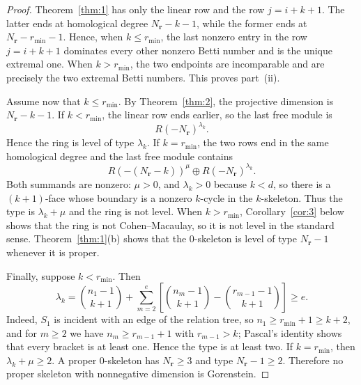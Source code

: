 \documentclass[10pt,a4paper]{amsart}
\begin{document}
\begin{proof}
		Theorem~\ref{thm:1} has only the linear row and the row $j=i+k+1$. The latter ends at homological degree $N_{\mathbf r}-k-1$, while the former ends at $N_{\mathbf r}-r_{\min}-1$. Hence, when $k\le r_{\min}$, the last nonzero entry in the row $j=i+k+1$ dominates every other nonzero Betti number and is the unique extremal one. When $k>r_{\min}$, the two endpoints are incomparable and are precisely the two extremal Betti numbers. This proves part~(ii).
		
		Assume now that $k\le r_{\min}$. By Theorem~\ref{thm:2}, the projective dimension is $N_{\mathbf r}-k-1$. If $k<r_{\min}$, the linear row ends earlier, so the last free module is
		\[
		R(-N_{\mathbf r})^{\lambda_k}.
		\]
		Hence the ring is level of type $\lambda_k$. If $k=r_{\min}$, the two rows end in the same homological degree and the last free module contains
		\[
		R(-(N_{\mathbf r}-k))^{\mu}\oplus R(-N_{\mathbf r})^{\lambda_k}.
		\]
		Both summands are nonzero: $\mu>0$, and $\lambda_k>0$ because $k<d$, so there is a $(k+1)$-face whose boundary is a nonzero $k$-cycle in the $k$-skeleton. Thus the type is $\lambda_k+\mu$ and the ring is not level. When $k>r_{\min}$, Corollary~\ref{cor:3} below shows that the ring is not Cohen--Macaulay, so it is not level in the standard sense. Theorem~\ref{thm:1}(b) shows that the $0$-skeleton is level of type $N_{\mathbf r}-1$ whenever it is proper.
		
		Finally, suppose $k<r_{\min}$. Then
		\[
		\lambda_k=
		\binom{n_1-1}{k+1}
		+\sum_{m=2}^{e}
		\left[
		\binom{n_m-1}{k+1}
		-
		\binom{r_{m-1}-1}{k+1}
		\right]\ge e.
		\]
		Indeed, $S_1$ is incident with an edge of the relation tree, so $n_1\ge r_{\min}+1\ge k+2$, and for $m\ge2$ we have $n_m\ge r_{m-1}+1$ with $r_{m-1}>k$; Pascal's identity shows that every bracket is at least one. Hence the type is at least two. If $k=r_{\min}$, then $\lambda_k+\mu\ge2$. A proper $0$-skeleton has $N_{\mathbf r}\ge3$ and type $N_{\mathbf r}-1\ge2$. Therefore no proper skeleton with nonnegative dimension is Gorenstein.
	\end{proof}
\end{document}
